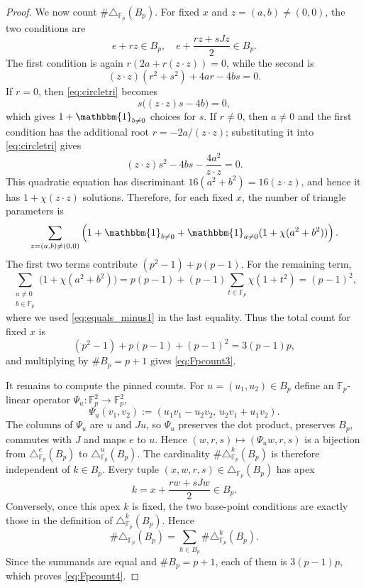 \documentclass[11pt,reqno]{amsart}
\numberwithin{equation}{section}
\begin{document}
\begin{proof}
We now count $\#\triangle_{\mathbb{F}_p}(B_p)$. For fixed $x$ and $z=(a,b)\neq(0,0)$, the two conditions are
\[ e+rz\in B_p, \quad e+\frac{rz+sJz}{2}\in B_p. \]
The first condition is again $r(2a+r(z\cdot z))=0$, while the second is
\begin{equation}\label{eq:circletri}
(z\cdot z)(r^2+s^2)+4ar-4bs=0.
\end{equation}
If $r=0$, then \eqref{eq:circletri} becomes
\[ s\bigl((z\cdot z)s-4b\bigr)=0, \]
which gives $1+\mathbbm{1}_{b\ne0}$ choices for $s$. If $r\neq 0$, then $a\neq 0$ and the first condition has the additional root $r=-2a/(z\cdot z)$; substituting it into \eqref{eq:circletri} gives
\[ (z\cdot z)s^2-4bs-\frac{4a^2}{z\cdot z}=0. \]
This quadratic equation has discriminant $16(a^2+b^2)=16(z\cdot z)$, and hence it has $1+\chi(z\cdot z)$ solutions. Therefore, for each fixed $x$, the number of triangle parameters is
\[ \sum_{z=(a,b)\neq(0,0)} \left(1+\mathbbm{1}_{b\ne0} + \mathbbm{1}_{a\ne0}(1+\chi(a^2+b^2))\right). \]
The first two terms contribute $(p^2-1)+p(p-1)$. For the remaining term,
\[ \sum_{\substack{a\ne0\\ b\in\mathbb{F}_p}} \bigl(1+\chi(a^2+b^2)\bigr)
= p(p-1)+(p-1)\sum_{t\in\mathbb{F}_p}\chi(1+t^2) = (p-1)^2, \]
where we used \eqref{eq:equals_minus1} in the last equality.
Thus the total count for fixed $x$ is
\[ (p^2-1)+p(p-1)+(p-1)^2=3(p-1)p, \]
and multiplying by $\#B_p=p+1$ gives \eqref{eq:Fpcount3}.

It remains to compute the pinned counts. For $u=(u_1,u_2)\in B_p$ define an $\mathbb{F}_p$-linear operator $\Psi_u\colon\mathbb{F}_p^2\to\mathbb{F}_p^2$,
\[ \Psi_u(v_1,v_2):=(u_1v_1-u_2v_2,\,u_2v_1+u_1v_2). \]
The columns of $\Psi_u$ are $u$ and $Ju$, so $\Psi_u$ preserves the dot product, preserves $B_p$, commutes with $J$ and maps $e$ to $u$. Hence $(w,r,s)\mapsto(\Psi_u w,r,s)$ is a bijection from $\triangle^e_{\mathbb{F}_p}(B_p)$ to $\triangle^u_{\mathbb{F}_p}(B_p)$. The cardinality $\#\triangle^k_{\mathbb{F}_p}(B_p)$ is therefore independent of $k\in B_p$.
Every tuple $(x,w,r,s)\in\triangle_{\mathbb{F}_p}(B_p)$ has apex
\[ k=x+\frac{rw+sJw}{2}\in B_p. \]
Conversely, once this apex $k$ is fixed, the two base-point conditions are exactly those in the definition of $\triangle^k_{\mathbb{F}_p}(B_p)$. Hence
\[ \#\triangle_{\mathbb{F}_p}(B_p) = \sum_{k\in B_p}\#\triangle^k_{\mathbb{F}_p}(B_p). \]
Since the summands are equal and $\#B_p=p+1$, each of them is $3(p-1)p$, which proves \eqref{eq:Fpcount4}.
\end{proof}
\end{document}
